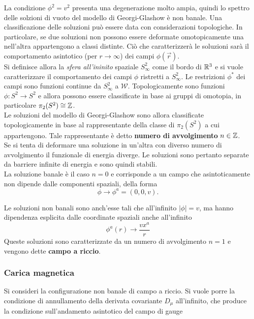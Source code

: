 La condizione $\phi^2 = v^2$ presenta una degenerazione molto ampia, quindi
lo spettro delle solzioni di vuoto del modello di Georgi-Glashow è non banale.
Una classificazione delle soluzioni può essere data con considerazioni topologiche.
In particolare, se due soluzioni non possono essere deformate omotopicamente una
nell'altra appartengono a classi distinte. Ciò che caratterizzerà le soluzioni
sarà il comportamento asintotico (per $r \to \infty$) dei campi $\phi(\vec r)$.\\

Si definisce allora la \emph{sfera all'ininito} spaziale $S^2_\infty$ come il bordo di
$\mathbb{R}^3$ e si vuole caratterizzare il comportamento dei campi $\phi$ ristretti a
$S^2_\infty$. Le restrizioni $\phi^*$ dei campi sono funzioni continue da $S^2_\infty$
a $\mathcal{W}$.
Topologicamente sono funzioni $\phi : S^2 \to S^2$ e allora possono essere
classificate in base ai gruppi di omotopia, in particolare $\pi_2(S^2) \cong \mathbb{Z}$.\\

Le soluzioni del modello di Georgi-Glashow sono allora classificate topologicamente
in base al rappresentante della classe di $\pi_2(S^2)$ a cui appartengono.
Tale rappresentante è detto \textbf{numero di avvolgimento} $n \in \mathbb{Z}$.\\

Se si tenta di deformare una soluzione in un'altra con diverso numero di avvolgimento
il funzionale di energia diverge. Le soluzioni sono pertanto separate da barriere
infinite di energia e sono quindi stabili.\\

La soluzione banale è il caso $n = 0$ e corrisponde a un campo che asintoticamente
non dipende dalle componenti spaziali, della forma
 $$\phi \to \phi^a = (0,0,v).$$

Le soluzioni non banali sono anch'esse tali che all'infinito $|\phi| = v$,
ma hanno dipendenza esplicita dalle coordinate spaziali anche all'infinito
\begin{equation}\label{eq:nonabelianw1phi}
   \phi^a(r) \to \frac{vx^a}{r}
\end{equation}
Queste soluzioni sono caratterizzate da un numero di avvolgimento $n=1$ e vengono
dette \textbf{campo a riccio}.

\subsubsection{Carica magnetica}
Si consideri la configurazione non banale di campo a riccio. Si vuole porre la
condizione di annullamento della derivata covariante $D _\mu$ all'infinito, che
produce la condizione sull'andamento asintotico del campo di gauge

